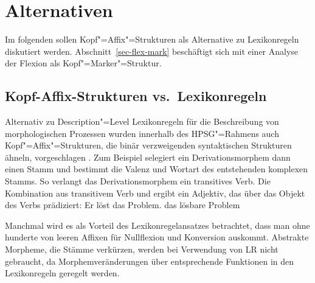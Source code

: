 \section{Alternativen}

Im folgenden sollen Kopf"=Affix"=Strukturen als Alternative zu Lexikonregeln diskutiert werden.
Abschnitt~\ref{sec-flex-mark} beschäftigt sich mit einer Analyse der Flexion als Kopf"=Marker"=Struktur.

\subsection{Kopf-Affix-Strukturen vs.\ Lexikonregeln}
\label{morphem-vs-lr}

Alternativ zu Description"=Level Lexikonregeln für die Beschreibung von morphologischen Prozessen
\parencites{Orgun96a}{Riehemann98a}{AW98a}{Koenig99a}[Kapitel~6.2.5]{Mueller2002b}{Crysmann2002a} wurden innerhalb des HPSG"=Rahmens
auch Kopf"=Affix"=Strukturen, die binär verzweigenden syntaktischen Strukturen ähneln, vorgeschlagen 
\parencites{KN93a}{Krieger94a}{Eynde94}{Lebeth94}.
Zum Beispiel selegiert ein Derivationsmorphem dann einen Stamm und bestimmt die Valenz und Wortart
des entstehenden komplexen Stamms. So verlangt das Derivationsmorphem  ein transitives
Verb. Die Kombination aus transitivem Verb und  ergibt ein Adjektiv, das über
das Objekt des Verbs prädiziert:
\eal
\ex Er löst das Problem.
\ex das lösbare Problem
\zl


\noindent
Manchmal wird es als Vorteil des Lexikonregelansatzes betrachtet, dass man ohne hunderte von leeren
Affixen für Nullflexion und Konversion auskommt. Abstrakte Morpheme, die Stämme verkürzen, werden bei Verwendung
von LR nicht gebraucht, da Morphemveränderungen über entsprechende Funktionen in den Lexikonregeln
geregelt werden. 

